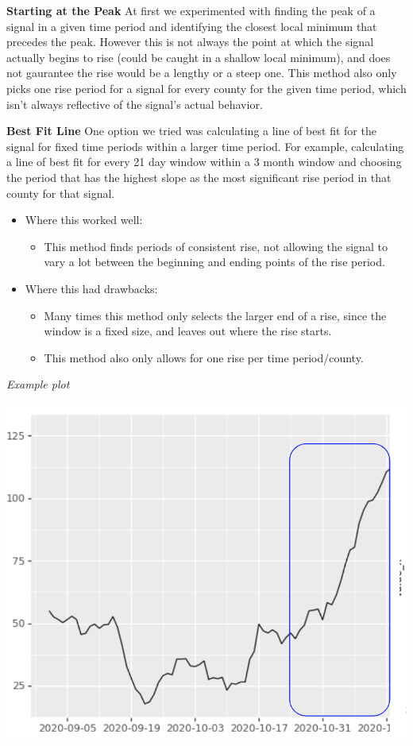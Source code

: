 \documentclass[]{article}
\providecommand{\tightlist}{%
  \setlength{\itemsep}{0pt}\setlength{\parskip}{0pt}}
\begin{document}
\textbf{Starting at the Peak} At first we experimented with finding the
peak of a signal in a given time period and identifying the closest
local minimum that precedes the peak. However this is not always the
point at which the signal actually begins to rise (could be caught in a
shallow local minimum), and does not gaurantee the rise would be a
lengthy or a steep one. This method also only picks one rise period for
a signal for every county for the given time period, which isn't always
reflective of the signal's actual behavior.

\textbf{Best Fit Line} One option we tried was calculating a line of
best fit for the signal for fixed time periods within a larger time
period. For example, calculating a line of best fit for every 21 day
window within a 3 month window and choosing the period that has the
highest slope as the most significant rise period in that county for
that signal.

\begin{itemize}
\tightlist
\item
  Where this worked well:

  \begin{itemize}
  \tightlist
  \item
    This method finds periods of consistent rise, not allowing the
    signal to vary a lot between the beginning and ending points of the
    rise period.
  \end{itemize}
\item
  Where this had drawbacks:

  \begin{itemize}
  \tightlist
  \item
    Many times this method only selects the larger end of a rise, since
    the window is a fixed size, and leaves out where the rise starts.
  \item
    This method also only allows for one rise per time period/county.
  \end{itemize}
\end{itemize}

\emph{Example plot}

\includegraphics{best_fit.png}
\end{document}
